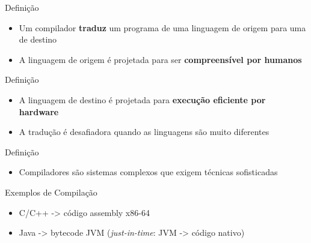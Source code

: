 \subtitle{\bf Aula 1 - Fases de um Compilador}
\begin{frame}[t,plain]
    \titlepage
\end{frame}

\begin{frame}{Definição}

    \begin{itemize}

        \item
        Um compilador \textbf{traduz} um programa de uma linguagem de origem
        para uma de destino
        \item
        A linguagem de origem é projetada para ser \textbf{compreensível por
        humanos}
    \end{itemize}
\end{frame}

\begin{frame}{Definição}

    \begin{itemize}

        \item
        A linguagem de destino é projetada para \textbf{execução eficiente por
        hardware}
        \item
        A tradução é desafiadora quando as linguagens são muito diferentes
    \end{itemize}
\end{frame}

\begin{frame}{Definição}

    \begin{itemize}

        \item
        Compiladores são sistemas complexos que exigem técnicas sofisticadas
    \end{itemize}
\end{frame}

\begin{frame}{Exemplos de Compilação}

    \begin{itemize}

        \item
        C/C++ -> código assembly x86-64
        \item
        Java -> bytecode JVM (\emph{just-in-time}: JVM -> código nativo)
    \end{itemize}
\end{frame}

